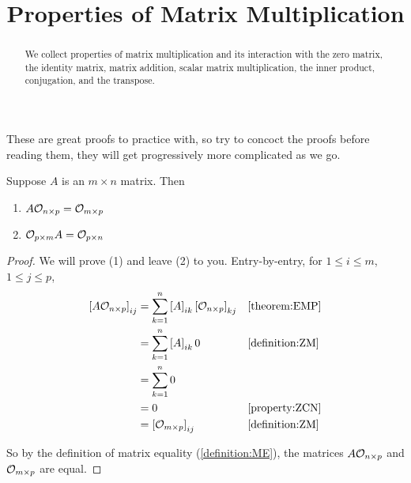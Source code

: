 \documentclass{ximera}
\title{Properties of Matrix Multiplication}
\begin{document}
\begin{abstract}
  We collect properties of matrix multiplication and its interaction
  with the zero matrix, the identity matrix, matrix addition, scalar
  matrix multiplication, the inner product, conjugation, and the
  transpose.
\end{abstract}
\maketitle

These are great proofs to practice with, so try to concoct the proofs
before reading them, they will get progressively more complicated as
we go.

\begin{theorem}
\label{theorem:MMZM}

Suppose $A$ is an $m\times n$ matrix.  Then
\begin{enumerate}
\item $A\mathcal{O}_{n\times p}=\mathcal{O}_{m\times p}$
\item $\mathcal{O}_{p\times m}A=\mathcal{O}_{p\times n}$
\end{enumerate}

\begin{proof}
  We will prove (1) and leave (2) to you.  Entry-by-entry, for $1\leq i\leq m$, $1\leq j\leq p$,
  \begin{align*}
    \left\lbrack A\mathcal{O}_{n\times p}\right\rbrack_{ij}
    &=\sum_{k=1}^{n}\left\lbrack A\right\rbrack_{ik}\left\lbrack\mathcal{O}_{n\times p}\right\rbrack_{kj}
    &&\ref{theorem:EMP}\\
    &=\sum_{k=1}^{n}\left\lbrack A\right\rbrack_{ik}0
    &&\ref{definition:ZM}\\
    &=\sum_{k=1}^{n}0\\
    &=0
    &&\ref{property:ZCN}\\
    &=\left\lbrack\mathcal{O}_{m\times p}\right\rbrack_{ij}
    &&\ref{definition:ZM}
  \end{align*}

  So by the definition of matrix equality (\ref{definition:ME}), the matrices $A\mathcal{O}_{n\times p}$ and $\mathcal{O}_{m\times p}$ are equal.
\end{proof}
\end{theorem}
\end{document}
